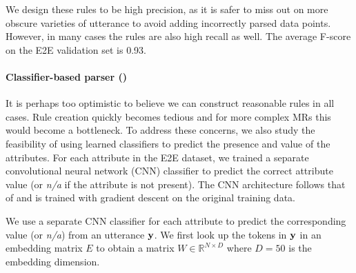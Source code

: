 We design these rules to be high precision, as it is safer to miss out on 
more obscure varieties of utterance to avoid adding incorrectly parsed data 
points.
However,  in many cases the rules are also high recall as well. 
The average F-score on the E2E validation set is 0.93.





\paragraph{Classifier-based parser (\learndmodel)} 
It is perhaps too optimistic to believe we can construct reasonable rules
in all cases. Rule creation quickly becomes tedious and for more complex
MRs this would become a bottleneck. To address these concerns, we also 
study the feasibility of using learned classifiers to predict the presence
and value of the attributes. For each attribute in the E2E dataset,
we trained a separate convolutional neural network (CNN) classifier 
to predict the correct attribute value (or \textit{n/a} if the attribute is 
not present).
The CNN architecture follows that of \citet{kim2014convolutional} and is 
trained with 
gradient descent on the original training data. 



We use a separate CNN classifier for each attribute to predict
the corresponding value (or \textit{n/a}) from an utterance $\mathbf{y}$.
We first look up the tokens in $\mathbf{y}$ in an embedding matrix $E$
to obtain a matrix $W\in\mathbb{R}^{N \times D}$ where $D=50$ is
the embedding dimension.

